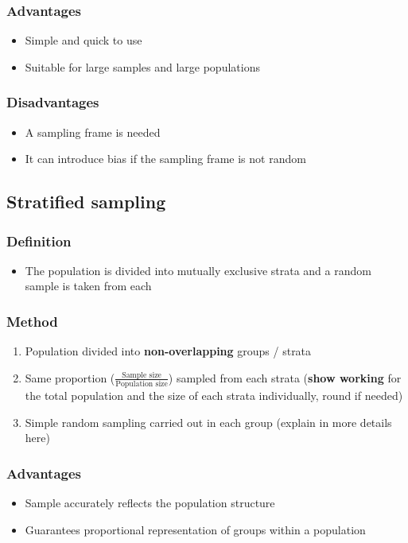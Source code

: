 \subsubsection{Advantages}
\begin{itemize}
    \item Simple and quick to use
    \item Suitable for large samples and large populations
\end{itemize}
\subsubsection{Disadvantages}
\begin{itemize}
    \item A sampling frame is needed
    \item It can introduce bias if the sampling frame is not random
\end{itemize}
\subsection{Stratified sampling}
\subsubsection{Definition}
\begin{itemize}
    \item The population is divided into mutually exclusive strata and a random sample is taken from each
\end{itemize}
\subsubsection{Method}
\begin{enumerate}
    \item Population divided into \textbf{non-overlapping} groups / strata
    \item Same proportion ($\frac{\text{Sample size}}{\text{Population size}}$) sampled from each strata (\textbf{show working} for the total population and the size of each strata individually, round if needed)
    \item Simple random sampling carried out in each group (explain in more details here)
\end{enumerate}
\subsubsection{Advantages}
\begin{itemize}
    \item Sample accurately reflects the population structure
    \item Guarantees proportional representation of groups within a population
\end{itemize}
